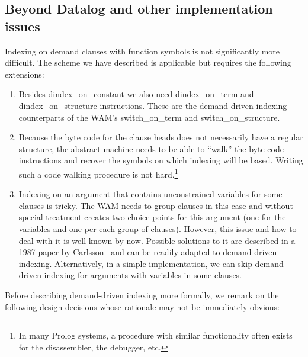 \documentclass{llncs}
\newcommand{\instr}[1]{\textsf{#1}}
\newcommand{\jitiONterm}{\mbox{\instr{dindex\_on\_term}}\xspace}
\newcommand{\jitiONconstant}{\mbox{\instr{dindex\_on\_constant}}\xspace}
\newcommand{\jitiONstructure}{\mbox{\instr{dindex\_on\_structure}}\xspace}
\newcommand{\switchONterm}{\mbox{\instr{switch\_on\_term}}\xspace}
\newcommand{\switchONstructure}{\mbox{\instr{switch\_on\_structure}}\xspace}
\newcommand{\JITI}{demand-driven indexing\xspace}
\begin{document}
\subsection{Beyond Datalog and other implementation issues}
Indexing on demand clauses with function symbols is not significantly
more difficult. The scheme we have described is applicable but
requires the following extensions:
\begin{enumerate}
\item Besides \jitiONconstant we also need \jitiONterm and
  \jitiONstructure instructions. These are the \JITI counterparts of
  the WAM's \switchONterm and \switchONstructure.
\item Because the byte code for the clause heads does not necessarily
  have a regular structure, the abstract machine needs to be able to
  ``walk'' the byte code instructions and recover the symbols on which
  indexing will be based. Writing such a code walking procedure is not
  hard.\footnote{In many Prolog systems, a procedure with similar
  functionality often exists for the disassembler, the debugger, etc.}
\item Indexing on an argument that contains unconstrained variables
  for some clauses is tricky. The WAM needs to group clauses in this
  case and without special treatment creates two choice points for
  this argument (one for the variables and one per each group of
  clauses). However, this issue and how to deal with it is well-known
  by now. Possible solutions to it are described in a 1987 paper by
  Carlsson~\cite{FreezeIndexing@ICLP-87} and can be readily adapted to
  \JITI. Alternatively, in a simple implementation, we can skip \JITI
  for arguments with variables in some clauses.
\end{enumerate}
Before describing \JITI more formally, we remark on the following
design decisions whose rationale may not be immediately obvious:
\end{document}
